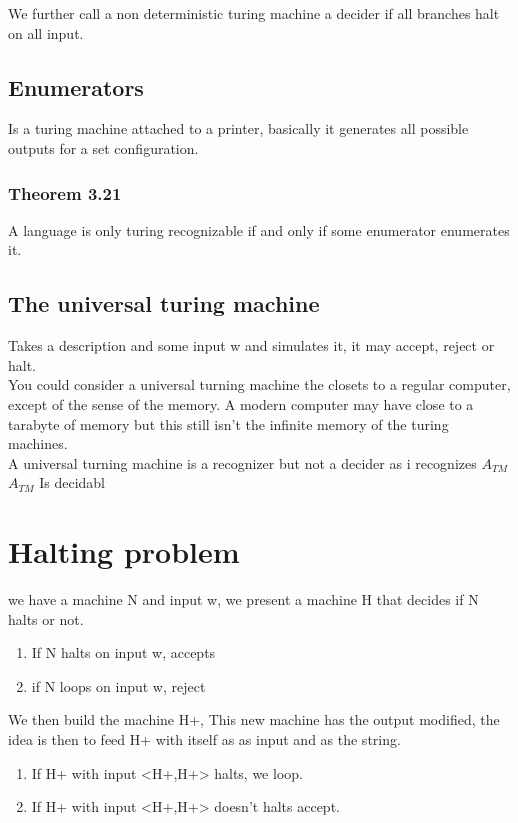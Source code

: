 \documentclass[a4paper,10pt,titlepage]{report}
\begin{document}
We further call a non deterministic turing machine a decider if all branches halt on all input.

\subsection{Enumerators}

Is a turing machine attached to a printer, basically it generates all possible outputs for a set configuration.

\subsubsection{Theorem 3.21}
A language is only turing recognizable if and only if some enumerator enumerates it.

\subsection{The universal turing machine}
Takes a description and some input w and simulates it, it may accept, reject or halt.\\

You could consider a universal turning machine the closets to a regular computer, except of the sense of the memory. A modern computer may have close to a tarabyte of memory but this still isn't the infinite memory of the turing machines.\\

A universal turning machine is a recognizer but not a decider as i recognizes $A_{TM}$\\


$A_{TM} $ Is decidabl


\section{Halting problem}
we have a machine N and input w, we present a machine H that decides if N halts or not.\\
\begin{enumerate}
\item If N halts on input w, accepts
\item if N loops on input w, reject
\end{enumerate}
We then build the machine H+, This new machine has the output modified, the idea is then to feed H+ with itself as as input and as the string.
\begin{enumerate}
\item If H+ with input <H+,H+> halts, we loop.
\item If H+ with input <H+,H+> doesn't halts accept.
\end{enumerate}
\end{document}
